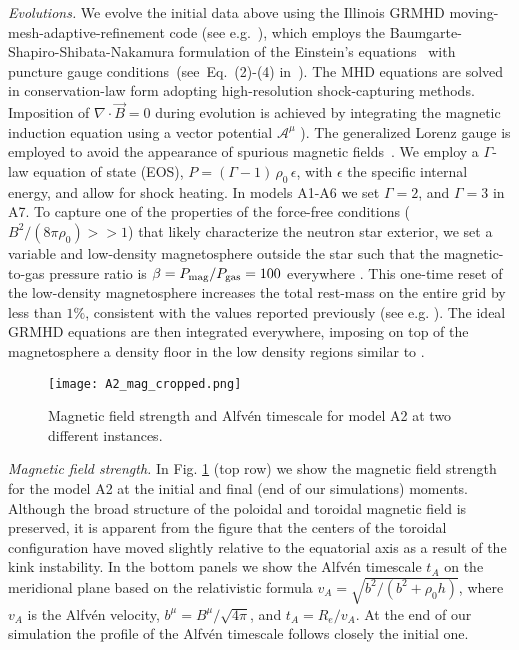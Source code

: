 \documentclass[twocolumn,superscriptaddress,showpacs,prl,aps,amsmath,amssymb,nofootinbib]{revtex4-1}
\begin{document}
\textit{Evolutions.}\textemdash
We evolve the initial data above  using the Illinois GRMHD
moving-mesh-adaptive-refinement code (see e.g.~\cite{Etienne:2010ui}), which
employs the Baumgarte-Shapiro-Shibata-Nakamura formulation of the Einstein’s
equations~\cite{shibnak95,BS} with  puncture gauge conditions~(see~Eq.~(2)-(4)
in~\cite{Etienne:2007jg}). The MHD equations are solved in conservation-law
form adopting high-resolution shock-capturing methods. Imposition of
$\nabla\cdot\vec{B}=0$ during  evolution is achieved by integrating the
magnetic induction equation using a vector potential  $\mathcal{A}^\mu$
\cite{Etienne:2010ui}). The generalized Lorenz gauge \cite{Farris:2012ux} is
employed to avoid the appearance of spurious magnetic
fields~\cite{Etienne:2011re}. We employ a $\Gamma$-law equation of state (EOS),
$P=(\Gamma-1)\,\rho_0\,\epsilon$, with $\epsilon$ the specific  internal
energy, and  allow for shock heating. In models A1-A6 we set $\Gamma=2$, and
$\Gamma=3$ in A7.  To capture one of the properties of the force-free
conditions ($B^2/(8\pi\rho_0)>>1$) that likely characterize the neutron star
exterior, we set a variable and low-density magnetosphere outside the star such
that the magnetic-to-gas pressure ratio is $\beta=P_{\rm mag}/P_{\rm gas}=100$
everywhere \cite{prs15}.  This one-time reset of the low-density magnetosphere
increases the total rest-mass on the entire grid by less than $1\%$, consistent
with the values reported previously (see e.g.
\cite{Ruiz:2016rai,Ruiz:2018wah}).  The ideal GRMHD equations are then
integrated everywhere, imposing on top of the magnetosphere a density floor in
the low density regions similar to
\cite{Ruiz:2020zaz,Ruiz:2016rai,Ruiz:2018wah}.


\begin{figure} 
\begin{center}
\texttt{[image: A2\_mag\_cropped.png]}
\caption{Magnetic field strength and Alfv\'en timescale for model A2 at two different instances.}
\label{fig:A2_mag}
\end{center}
\end{figure}
\textit{Magnetic field strength.}\textemdash 
In Fig. \ref{fig:A2_mag} (top row) we show the magnetic field strength for the
model A2 at the initial and final (end of our simulations) moments. Although
the broad structure of the poloidal and toroidal magnetic field is preserved,
it is apparent from the figure that the centers of the toroidal configuration
have moved slightly relative to the equatorial axis as a result of the kink
instability. In the bottom panels we show the Alfv\'en timescale $t_A$ on the
meridional plane based on the relativistic formula $v_A=\sqrt{b^2/(b^2+\rho_0
h)}$, where $v_A$ is the Alfv\'en velocity, $b^\mu=B^\mu/\sqrt{4\pi}$, and
$t_A=R_e/v_A$.  At the end of our simulation the profile of the Alfv\'en
timescale follows closely the initial one.






\end{document}
